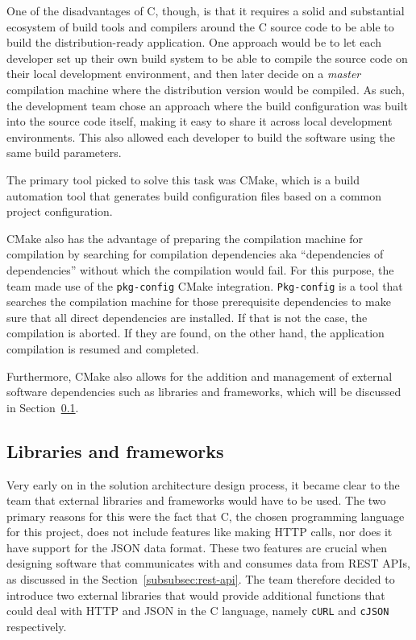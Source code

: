 One of the disadvantages of C, though, is that it requires a solid and substantial ecosystem of build tools and
compilers around the C source code to be able to build the distribution-ready application.
One approach would be to let each developer set up their own build system to be able to compile the source code on their
local development environment, and then later decide on a \textit{master} compilation machine where the distribution
version would be compiled.
As such, the development team chose an approach where the build configuration was built into the source code itself,
making it easy to share it across local development environments.
This also allowed each developer to build the software using the same build parameters.

The primary tool picked to solve this task was CMake, which is a build automation tool that generates build
configuration files based on a common project configuration.

CMake also has the advantage of preparing the compilation machine for compilation by searching for compilation
dependencies aka ``dependencies of dependencies'' without which the compilation would fail.
For this purpose, the team made use of the \lstinline{pkg-config} CMake integration.
\lstinline{Pkg-config} is a tool that searches the compilation machine for those prerequisite dependencies to make sure
that all direct dependencies are installed.
If that is not the case, the compilation is aborted.
If they are found, on the other hand, the application compilation is resumed and completed.

Furthermore, CMake also allows for the addition and management of external software dependencies such as libraries
and frameworks, which will be discussed in Section~\ref{subsec:libraries-and-frameworks}.

\subsection{Libraries and frameworks}\label{subsec:libraries-and-frameworks}

Very early on in the solution architecture design process, it became clear to the team that external libraries and
frameworks would have to be used.
The two primary reasons for this were the fact that C, the chosen programming language for this project, does not
include features like making HTTP calls, nor does it have support for the JSON data format.
These two features are crucial when designing software that communicates with and consumes data from REST APIs, as
discussed in the Section~\ref{subsubsec:rest-api}.
The team therefore decided to introduce two external libraries that would provide additional functions that could
deal with HTTP and JSON in the C language, namely \lstinline{cURL} and \lstinline{cJSON} respectively.

